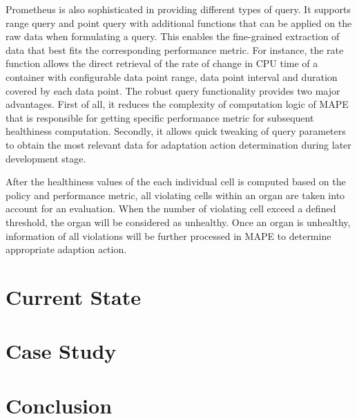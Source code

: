 \documentclass{seal_thesis}
\begin{document}
Prometheus is also sophisticated in providing different types of query. It supports range query and point query with additional functions that can be applied on the raw data when formulating a query. This enables the fine-grained extraction of data that best fits the corresponding performance metric. For instance, the rate function allows the direct retrieval of the rate of change in CPU time of a container with configurable data point range, data point interval and duration covered by each data point. The robust query functionality provides two major advantages. First of all, it reduces the complexity of computation logic of MAPE that is responsible for getting specific performance metric for subsequent healthiness computation. Secondly, it allows quick tweaking of query parameters to obtain the most relevant data for adaptation action determination during later development stage. 

After the healthiness values of the each individual cell is computed based on the policy and performance metric, all violating cells within an organ are taken into account for an evaluation. When the number of violating cell exceed a defined threshold, the organ will be considered as unhealthy. Once an organ is unhealthy, information of all violations will be further processed in MAPE to determine appropriate adaption action.


\chapter{Current State}



\chapter{Case Study}



\chapter{Conclusion}




\end{document}
